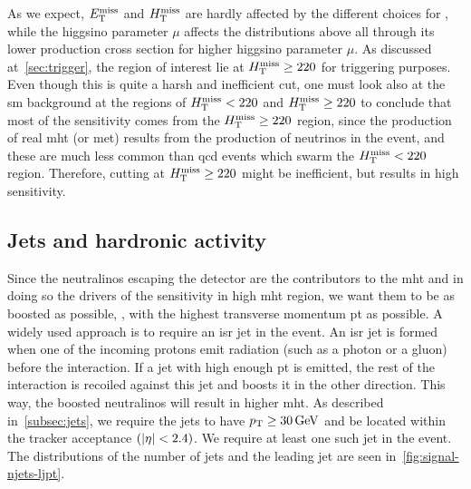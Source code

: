 As we expect, $E_{\mathrm{T}}^{\text{miss}}$ and $H_{\mathrm{T}}^{\text{miss}}$ are hardly affected by the different choices for \dm, while the higgsino parameter $\mu$ affects the distributions above all through its lower production cross section for higher higgsino parameter $\mu$. As discussed at~\ref{sec:trigger}, the region of interest lie at $H_{\mathrm{T}}^{\text{miss}}\geq 220$ for triggering purposes. Even though this is quite a harsh and inefficient cut, one must look also at the \gls{sm} background at the regions of $H_{\mathrm{T}}^{\text{miss}} < 220$ and $H_{\mathrm{T}}^{\text{miss}}\geq 220$ to conclude that most of the sensitivity comes from the $H_{\mathrm{T}}^{\text{miss}}\geq 220$ region, since the production of real \gls{mht} (or \gls{met}) results from the production of neutrinos in the event, and these are much less common than \gls{qcd} events which swarm the $H_{\mathrm{T}}^{\text{miss}} < 220$ region. Therefore, cutting at $H_{\mathrm{T}}^{\text{miss}}\geq 220$ might be inefficient, but results in high sensitivity. 

\subsection{Jets and hardronic activity}

Since the \glspl{neutralino} \neuto escaping the detector are the contributors to the \gls{mht} and in doing so the drivers of the sensitivity in high \gls{mht} region, we want them to be as boosted as possible, \ie, with the highest transverse momentum \gls{pt} as possible. A widely used approach is to require an \gls{isr} jet in the event. An \gls{isr} jet is formed when one of the incoming protons emit radiation (such as a photon or a gluon) before the interaction. If a jet with high enough \gls{pt} is emitted, the rest of the interaction is recoiled against this jet and boosts it in the other direction. This way, the boosted \glspl{neutralino} \neuto will result in higher \gls{mht}. As described in~\ref{subsec:jets}, we require the jets to have $p_{\mathrm{T}} \geq 30\,\text{Ge\hspace{-.08em}V}$ and be located within the tracker acceptance $\left(\lvert \eta \rvert<2.4\right)$. We require at least one such jet in the event. The distributions of the number of jets and the leading jet \pt are seen in~\ref{fig:signal-njets-ljpt}.

